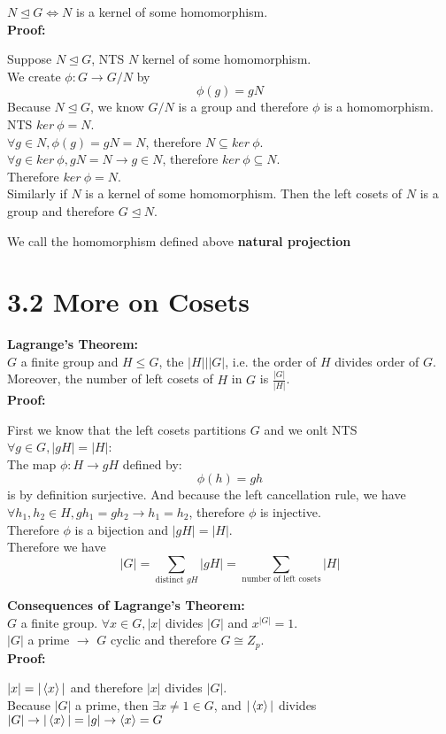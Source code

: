 \documentclass{article}
\begin{document}
$N \trianglelefteq G \iff N$ is a kernel of some homomorphism.\\
\textbf{Proof:}\\
\begin{addmargin}[1em]{0em}
Suppose $N \trianglelefteq G$, NTS $N$ kernel of some homomorphism.\\
We create $\phi: G \rightarrow G/N$ by
\begin{equation*}
    \phi(g) = gN
\end{equation*}
Because $N \trianglelefteq G$, we know $G/N$ is a group and therefore $\phi$ is a homomorphism. NTS $ker\ \phi = N$.\\
$\forall g \in N, \phi(g) = gN = N$, therefore $N \subseteq ker\ \phi$.\\
$\forall g \in ker\ \phi, gN = N \rightarrow g \in N$, therefore $ker\ \phi \subseteq N$.\\
Therefore $ker\ \phi = N$.\\
Similarly if $N$ is a kernel of some homomorphism. Then the left cosets of $N$ is a group and therefore $G \trianglelefteq N$.
\end{addmargin}
We call the homomorphism defined above \textbf{natural projection}\
\section{3.2 More on Cosets}
\textbf{Lagrange's Theorem:}\\
$G$ a finite group and $H \leq G$, the $|H|||G|$, i.e. the order of $H$ divides order of $G$. Moreover, the number of left cosets of $H$ in $G$ is $\frac{|G|}{|H|}$.\\
\textbf{Proof:}
\begin{addmargin}[1em]{0em}
First we know that the left cosets partitions $G$ and we onlt NTS $\forall g \in G, |gH| = |H|$:\\
The map $\phi: H \rightarrow gH$ defined by:
\begin{equation*}
    \phi(h) = gh
\end{equation*}
is by definition surjective. And because the left cancellation rule, we have $\forall h_1, h_2 \in H, gh_1 = gh_2 \rightarrow h_1 = h_2$, therefore $\phi$ is injective.\\
Therefore $\phi$ is a bijection and $|gH| = |H|$.\\
Therefore we have
\begin{equation*}
    |G| = \sum_{\textrm{distinct }gH} |gH| = \sum_{\textrm{number of left cosets}} |H|
\end{equation*}
\end{addmargin}
\textbf{Consequences of Lagrange's Theorem:}\\
$G$ a finite group. $\forall x \in G, |x|$ divides $|G|$ and $x^{|G|} = 1$.\\
$|G|$ a prime $\rightarrow$ $G$ cyclic and therefore $G \cong Z_p$.\\
\textbf{Proof:}
\begin{addmargin}[1em]{0em}
$|x| = |\braket{x}|$ and therefore $|x|$ divides $|G|$.\\
Because $|G|$ a prime, then $\exists x \neq 1 \in G$, and $|\braket{x}|$ divides $|G| \rightarrow |\braket{x}| = |g| \rightarrow \braket{x} = G$
\end{addmargin}
\end{document}

